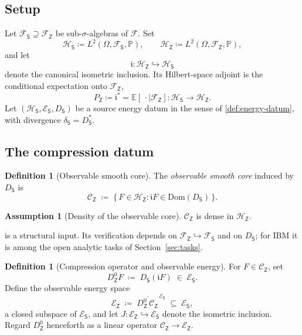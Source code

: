 \documentclass[11pt,reqno]{amsart}
\theoremstyle{plain}
\theoremstyle{definition}
\newtheorem{definition}[theorem]{Definition}
\newtheorem{assumption}[theorem]{Assumption}
\theoremstyle{remark}
\newcommand{\E}{\mathbb{E}}
\newcommand{\Prob}{\mathbb{P}}
\newcommand{\Hilb}{\mathcal{H}}
\newcommand{\Dom}{\mathrm{Dom}}
\newcommand{\Energy}{\mathcal{E}}
\newcommand{\Source}{\mathsf{S}}
\newcommand{\Obs}{\mathsf{Z}}
\renewcommand{\iota}{\mathfrak{i}}
\begin{document}
\subsection*{Setup}

Let $\mathcal F_\Source\supseteq\mathcal F_\Obs$ be sub-$\sigma$-algebras
of $\mathcal F$. Set
\[
  \Hilb_\Source\coloneqq L^2(\Omega,\mathcal F_\Source,\Prob),\qquad
  \Hilb_\Obs\coloneqq L^2(\Omega,\mathcal F_\Obs,\Prob),
\]
and let
\[
  \iota\colon \Hilb_\Obs\hookrightarrow\Hilb_\Source
\]
denote the canonical isometric inclusion. Its Hilbert-space adjoint is
the conditional expectation onto $\mathcal F_\Obs$,
\[
  P_\Obs\coloneqq\iota^{*}=\E[\,\cdot\mid\mathcal F_\Obs]\colon
  \Hilb_\Source\to\Hilb_\Obs.
\]
Let $(\Hilb_\Source,\Energy_\Source,D_\Source)$ be a source energy datum
in the sense of \cref{def:energy-datum}, with divergence
$\delta_\Source=D_\Source^{*}$.

\subsection*{The compression datum}

\begin{definition}[Observable smooth core]\label{def:obs-core}
The \emph{observable smooth core} induced by $D_\Source$ is
\[
  \mathcal C_\Obs
  \;\coloneqq\;
  \bigl\{\,F\in\Hilb_\Obs : \iota F\in\Dom(D_\Source)\,\bigr\}.
\]
\end{definition}

\begin{assumption}[Density of the observable core]\label{ass:dense}
$\mathcal C_\Obs$ is dense in $\Hilb_\Obs$.
\end{assumption}

 is a structural input. Its verification depends on
$\mathcal F_\Obs\hookrightarrow\mathcal F_\Source$ and on $D_\Source$; for
IBM it is among the open analytic tasks of Section~\ref{sec:tasks}.

\begin{definition}[Compression operator and observable energy]
\label{def:compression}
For $F\in\mathcal C_\Obs$, set
\[
  D_\Obs^{0} F \;\coloneqq\; D_\Source(\iota F) \;\in\; \Energy_\Source.
\]
Define the observable energy space
\[
  \Energy_\Obs
  \;\coloneqq\;
  \overline{D_\Obs^{0}\,\mathcal C_\Obs}^{\,\Energy_\Source}
  \;\subseteq\;\Energy_\Source,
\]
a closed subspace of $\Energy_\Source$, and let
$J\colon\Energy_\Obs\hookrightarrow\Energy_\Source$ denote the isometric
inclusion. Regard $D_\Obs^{0}$ henceforth as a linear operator
$\mathcal C_\Obs\to\Energy_\Obs$.
\end{definition}
\end{document}
